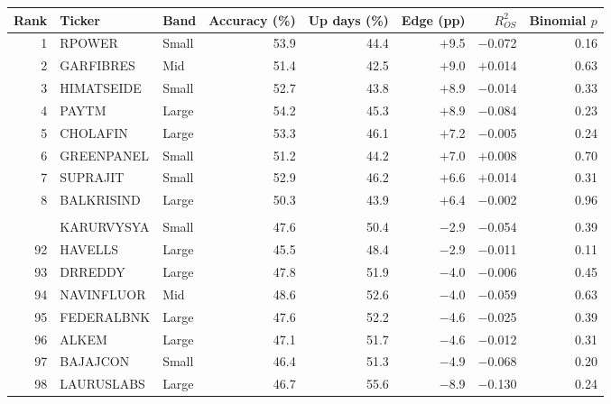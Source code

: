 \begin{tabular}{@{}rllrrrrr@{}}
\toprule
Rank & Ticker & Band & Accuracy (\%) & Up days (\%) & Edge (pp) & $R^2_{OS}$ & Binomial $p$ \\
\midrule
1 & RPOWER & Small & 53.9 & 44.4 & $+$9.5 & $-$0.072 & 0.16 \\
2 & GARFIBRES & Mid & 51.4 & 42.5 & $+$9.0 & $+$0.014 & 0.63 \\
3 & HIMATSEIDE & Small & 52.7 & 43.8 & $+$8.9 & $-$0.014 & 0.33 \\
4 & PAYTM & Large & 54.2 & 45.3 & $+$8.9 & $-$0.084 & 0.23 \\
5 & CHOLAFIN & Large & 53.3 & 46.1 & $+$7.2 & $-$0.005 & 0.24 \\
6 & GREENPANEL & Small & 51.2 & 44.2 & $+$7.0 & $+$0.008 & 0.70 \\
7 & SUPRAJIT & Small & 52.9 & 46.2 & $+$6.6 & $+$0.014 & 0.31 \\
8 & BALKRISIND & Large & 50.3 & 43.9 & $+$6.4 & $-$0.002 & 0.96 \\
\addlinespace
\multicolumn{8}{@{}c}{\textit{\dots}} \\
\addlinespace
91 & KARURVYSYA & Small & 47.6 & 50.4 & $-$2.9 & $-$0.054 & 0.39 \\
92 & HAVELLS & Large & 45.5 & 48.4 & $-$2.9 & $-$0.011 & 0.11 \\
93 & DRREDDY & Large & 47.8 & 51.9 & $-$4.0 & $-$0.006 & 0.45 \\
94 & NAVINFLUOR & Mid & 48.6 & 52.6 & $-$4.0 & $-$0.059 & 0.63 \\
95 & FEDERALBNK & Large & 47.6 & 52.2 & $-$4.6 & $-$0.025 & 0.39 \\
96 & ALKEM & Large & 47.1 & 51.7 & $-$4.6 & $-$0.012 & 0.31 \\
97 & BAJAJCON & Small & 46.4 & 51.3 & $-$4.9 & $-$0.068 & 0.20 \\
98 & LAURUSLABS & Large & 46.7 & 55.6 & $-$8.9 & $-$0.130 & 0.24 \\
\bottomrule
\end{tabular}
